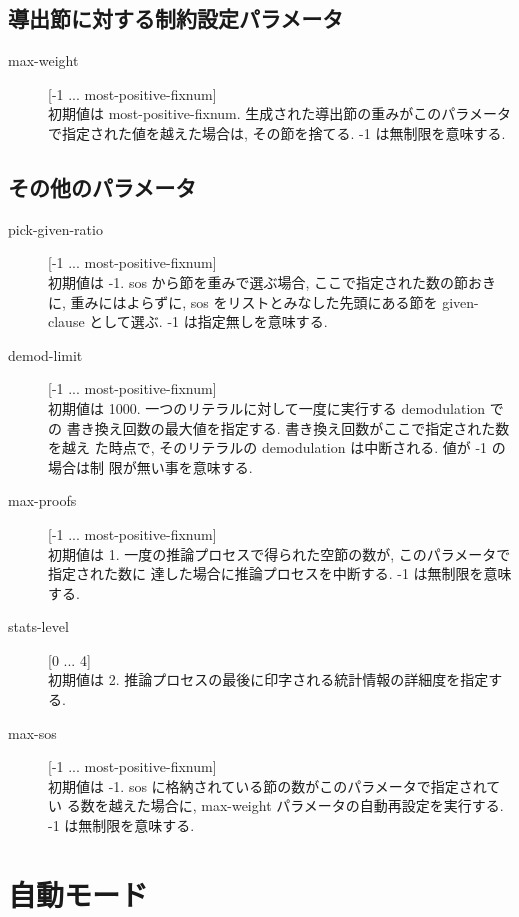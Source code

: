 \subsection{導出節に対する制約設定パラメータ}

\begin{description}
\item[max-weight] [-1 ... most-positive-fixnum] \\
  初期値は most-positive-fixnum. 
  生成された導出節の重みがこのパラメータで指定された値を越えた場合は,
  その節を捨てる. -1 は無制限を意味する.
\end{description}

\subsection{その他のパラメータ}
\label{sec:misc-params}

\begin{description}
\item[pick-given-ratio] [-1 ... most-positive-fixnum] \\
  初期値は -1. 
  sos から節を重みで選ぶ場合, ここで指定された数の節おきに,
  重みにはよらずに, sos をリストとみなした先頭にある節を given-clause 
  として選ぶ. 
  -1 は指定無しを意味する.
\item[demod-limit] [-1 ... most-positive-fixnum] \\
  初期値は 1000. 一つのリテラルに対して一度に実行する demodulation での
  書き換え回数の最大値を指定する. 書き換え回数がここで指定された数を越え
  た時点で, そのリテラルの demodulation は中断される. 値が -1 の場合は制
  限が無い事を意味する. 
\item[max-proofs] [-1 ... most-positive-fixnum] \\
  初期値は 1.
  一度の推論プロセスで得られた空節の数が, このパラメータで指定された数に
  達した場合に推論プロセスを中断する. -1 は無制限を意味する.
\item[stats-level] [0 ... 4] \\
  初期値は 2. 推論プロセスの最後に印字される統計情報の詳細度を指定する.
\item[max-sos] [-1 ... most-positive-fixnum] \\
  初期値は -1. sos に格納されている節の数がこのパラメータで指定されてい
  る数を越えた場合に, max-weight パラメータの自動再設定を実行する.
  -1 は無制限を意味する.
\end{description}

\section{自動モード}
\label{sec:auto-mode}


